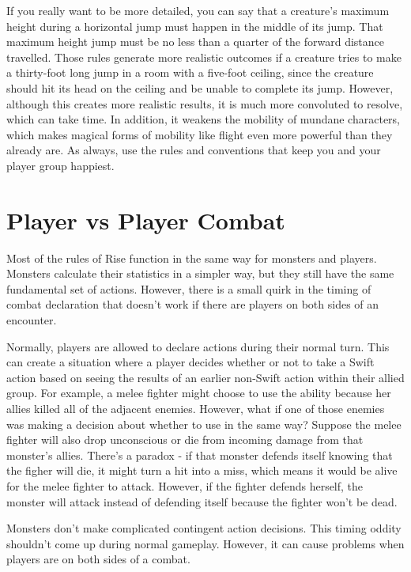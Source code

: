     If you really want to be more detailed, you can say that a creature's maximum height during a horizontal jump must happen in the middle of its jump.
    That maximum height jump must be no less than a quarter of the forward distance travelled.
    Those rules generate more realistic outcomes if a creature tries to make a thirty-foot long jump in a room with a five-foot ceiling, since the creature should hit its head on the ceiling and be unable to complete its jump.
    However, although this creates more realistic results, it is much more convoluted to resolve, which can take time.
    In addition, it weakens the mobility of mundane characters, which makes magical forms of mobility like flight even more powerful than they already are.
    As always, use the rules and conventions that keep you and your player group happiest.

\section{Player vs Player Combat}
  Most of the rules of Rise function in the same way for monsters and players.
  Monsters calculate their statistics in a simpler way, but they still have the same fundamental set of actions.
  However, there is a small quirk in the timing of combat declaration that doesn't work if there are players on both sides of an encounter.

  Normally, players are allowed to declare  actions during their normal turn.
  This can create a situation where a player decides whether or not to take a Swift action based on seeing the results of an earlier non-Swift action within their allied group.
  For example, a melee fighter might choose to use the  ability because her allies killed all of the adjacent enemies.
  However, what if one of those enemies was making a decision about whether to use  in the same way?
  Suppose the melee fighter will also drop unconscious or die from incoming damage from that monster's allies.
  There's a paradox - if that monster defends itself knowing that the figher will die, it might turn a hit into a miss, which means it would be alive for the melee fighter to attack.
  However, if the fighter defends herself, the monster will attack instead of defending itself because the fighter won't be dead.

  Monsters don't make complicated contingent action decisions.
  This timing oddity shouldn't come up during normal gameplay.
  However, it can cause problems when players are on both sides of a combat.

